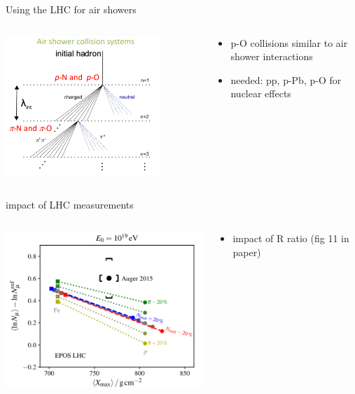 \documentclass[aspectratio=1610, 9pt]{beamer}
\begin{document}
\begin{frame}{Using the LHC for air showers}
  \begin{columns}
    \begin{column}[c]{0.48\textwidth}
      \includegraphics[width=0.8\textwidth]{lhc_shower.png}
    \end{column}
    \begin{column}[c]{0.48\textwidth}
      \begin{itemize}
        \item p-O collisions similar to air shower interactions
        \item needed: pp, p-Pb, p-O for nuclear effects
      \end{itemize}
    \end{column}
  \end{columns}
\end{frame}

\begin{frame}{impact of LHC measurements}
  \begin{columns}
    \begin{column}[c]{0.48\textwidth}
      \includegraphics{x_max_impact.png}
    \end{column}
    \begin{column}[c]{0.48\textwidth}
      \begin{itemize}
        \item impact of R ratio (fig 11 in paper)
      \end{itemize}
    \end{column}
  \end{columns}
\end{frame}
\end{document}

